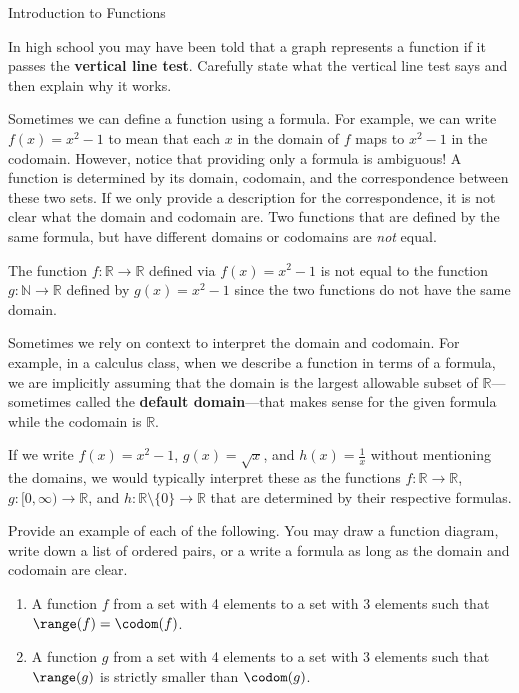 \begin{section}{Introduction to Functions}
\begin{problem}
In high school you may have been told that a graph represents a function if it passes the \textbf{vertical line test}.  Carefully state what the vertical line test says and then explain why it works.
\end{problem}

Sometimes we can define a function using a formula. For example, we can write $f(x)=x^2-1$ to mean that each $x$ in the domain of $f$ maps to $x^2-1$ in the codomain. However, notice that providing only a formula is ambiguous!  A function is determined by its domain, codomain, and the correspondence between these two sets. If we only provide a description for the correspondence, it is not clear what the domain and codomain are.  Two functions that are defined by the same formula, but have different domains or codomains are \emph{not} equal.  

\begin{example}
The function $f:\mathbb{R}\to \mathbb{R}$ defined via $f(x)=x^{2}-1$ is not equal to the function $g:\mathbb{N}\to\mathbb{R}$ defined by $g(x)=x^{2}-1$ since the two functions do not have the same domain.
\end{example}

Sometimes we rely on context to interpret the domain and codomain.  For example, in a calculus class, when we describe a function in terms of a formula, we are implicitly assuming that the domain is the largest allowable subset of $\mathbb{R}$---sometimes called the \textbf{default domain}---that makes sense for the given formula while the codomain is $\mathbb{R}$. 

\begin{example}
If we write $f(x)=x^2-1$, $g(x)=\sqrt{x}$, and $h(x)=\frac{1}{x}$ without mentioning the domains, we would typically interpret these as the functions $f:\mathbb{R}\to \mathbb{R}$, $g:[0,\infty)\to \mathbb{R}$, and $h:\mathbb{R}\setminus \{0\}\to \mathbb{R}$ that are determined by their respective formulas.
\end{example}

\begin{problem}
Provide an example of each of the following.  You may draw a function diagram, write down a list of ordered pairs, or a write a formula as long as the domain and codomain are clear.
\begin{enumerate}[label=\textrm{(\alph*)}]
\item A function $f$ from a set with 4 elements to a set with 3 elements such that $\range(f)=\codom(f)$.
\item A function $g$ from a set with 4 elements to a set with 3 elements such that $\range(g)$ is strictly smaller than $\codom(g)$.
\end{enumerate}
\end{problem}


\end{section}
